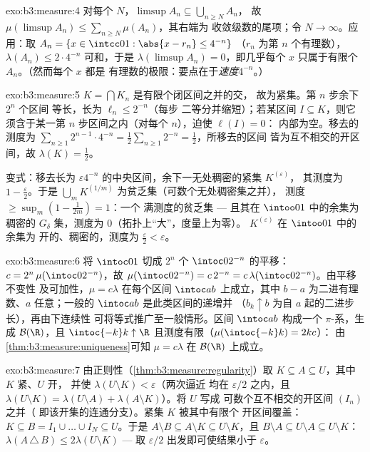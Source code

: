 \begin{solution}{exo:b3:measure:4}
对每个 $N$，$\limsup A_n \subseteq \bigcup_{n \geq N}A_n$，
故 $\mu(\limsup A_n) \leq \sum_{n\geq N}\mu(A_n)$，其右端为
收敛级数的尾项；令 $N \to \infty$。应用：取
$A_n = \{x \in \intcc01 : \abs{x - r_n} \leq 4^{-n}\}$
（$r_n$ 为第 $n$ 个有理数），$\lambda(A_n) \leq 2\cdot4^{-n}$
可和，于是 $\lambda(\limsup A_n) = 0$，即几乎每个 $x$
只属于有限个 $A_n$。（然而每个 $x$ 都是
有理数的极限：要点在于\emph{速度}$4^{-n}$。）
\end{solution}

\begin{solution}{exo:b3:measure:5}
$K = \bigcap K_n$ 是有限个闭区间之并的交，
故为紧集。第 $n$ 步余下 $2^n$ 个区间
等长，长为 $\ell_n \leq 2^{-n}$（每步
二等分并缩短）；若某区间 $I \subseteq K$，则它
须含于某一第 $n$ 步区间之内（对每个 $n$），迫使 $\ell(I) = 0$：
内部为空。移去的测度为 $\sum_{n\geq1}2^{n-1}\cdot
4^{-n} = \frac12\sum_{n\geq1}2^{-n} = \frac12$，所移去的区间
皆为互不相交的开区间，故 $\lambda(K) = \frac12$。

变式：移去长为 $\varepsilon
4^{-n}$ 的中央区间，余下一无处稠密的紧集 $K^{(\varepsilon)}$，
其测度为 $1 - \frac\varepsilon2$。于是 $\bigcup_m
K^{(1/m)}$ 为贫乏集（可数个无处稠密集之并），
测度 $\geq \sup_m(1 - \frac1{2m}) = 1$：一个
满测度的贫乏集 --- 且其在 $\intoo01$ 中的余集为
稠密的 $G_\delta$ 集，测度为 $0$（拓扑上“大”，度量上为零）。
$K^{(\varepsilon)}$ 在 $\intoo01$ 中的余集为
开的、稠密的，测度为 $\frac\varepsilon2 < \varepsilon$。
\end{solution}

\begin{solution}{exo:b3:measure:6}
将 $\intoc01$ 切成 $2^n$ 个 $\intoc0{2^{-n}}$ 的平移：
$c = 2^n\,\mu(\intoc0{2^{-n}})$，故 $\mu(\intoc0{2^{-n}}) =
c\,2^{-n} = c\,\lambda(\intoc0{2^{-n}})$。由平移不变性
及可加性，$\mu = c\lambda$ 在每个区间
$\intoc ab$ 上成立，其中 $b - a$ 为二进有理数、$a$ 任意；一般的
$\intoc ab$ 是此类区间的递增并
（$b_k \uparrow b$ 为自 $a$ 起的二进步长），再由下连续性
可将等式推广至一般情形。区间 $\intoc ab$ 构成一个
$\pi$-系，生成 $\mathcal B(\R)$，且 $\intoc{-k}k
\uparrow \R$ 且测度有限（$\mu(\intoc{-k}k) = 2kc$）：
由\cref{thm:b3:measure:uniqueness}可知 $\mu = c\lambda$ 在
$\mathcal B(\R)$ 上成立。
\end{solution}

\begin{solution}{exo:b3:measure:7}
由正则性（\cref{thm:b3:measure:regularity}）取 $K
\subseteq A \subseteq U$，其中 $K$ 紧、$U$ 开，
并使 $\lambda(U\setminus K) < \varepsilon$（两次逼近
均在 $\varepsilon/2$ 之内，且 $\lambda(U \setminus K) =
\lambda(U\setminus A) + \lambda(A \setminus K)$）。将 $U$ 写成
可数个互不相交的开区间 $(I_n)$ 之并（
即该开集的连通分支）。紧集 $K$ 被其中有限个
开区间覆盖：$K \subseteq B = I_1\cup\dots\cup I_N \subseteq
U$。于是 $A \setminus B \subseteq A\setminus K \subseteq
U\setminus K$，且 $B \setminus A \subseteq U \setminus A
\subseteq U\setminus K$：
$\lambda(A\,\triangle\,B) \leq 2\lambda(U\setminus K)$ ---
取 $\varepsilon/2$ 出发即可使结果小于 $\varepsilon$。
\end{solution}

